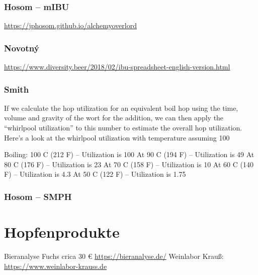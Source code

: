 \documentclass[a4paper,parskip=half]{scrartcl}
\begin{document}
\parencite{Wolf2022}

\subsubsection*{Hosom – mIBU}

\url{https://jphosom.github.io/alchemyoverlord}

\parencite{Hosom2015}

\subsubsection*{Novotný}

\url{https://www.diversity.beer/2018/02/ibu-spreadsheet-english-version.html}
\parencite{Novotny2016}
\parencite{Novotny2018}

\subsubsection*{Smith}

\parencite{Smith2019}

If we calculate the hop utilization for an equivalent boil hop using the time, volume and gravity of the wort for the addition, we can then apply the “whirlpool utilization” to this number to estimate the overall hop utilization. Here’s a look at the whirlpool utilization with temperature assuming 100%

    Boiling: 100 C (212 F) – Utilization is 100%
    At 90 C (194 F) – Utilization is 49%
    At 80 C (176 F) – Utilization is 23%
    At 70 C (158 F) – Utilization is 10%
    At 60 C (140 F) – Utilization is 4.3%
    At 50 C (122 F) – Utilization is 1.75%

\subsubsection*{Hosom – SMPH}

\parencite{Hosom2021}

\section*{Hopfenprodukte}


\parencite{Janish2019}
\parencite{Hieronymus2012}
\parencite{Nottebohm2020}
\parencite{Hall1997}
\parencite{Pyle1995}
\parencite{Justus2018}
\parencite{Parkin2017}
\parencite{Bishop1964}
\parencite{Nickerson1979}
\parencite{Calado2019}

\parencite{Bruecklmeier2017}
\parencite{Bruecklmeier2018}

Bieranalyse Fuchs crica 30 € \url{https://bieranalyse.de/}
Weinlabor Krauß: \url{https://www.weinlabor-krauss.de}

\printbibliography[title=Quellen]
\end{document}
